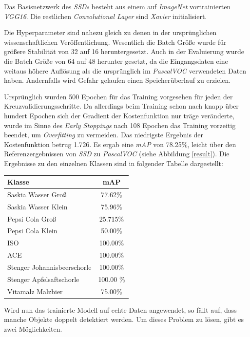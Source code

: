 Das Basisnetzwerk des \textit{SSDs} besteht aus einem auf \textit{ImageNet} vortrainierten \textit{VGG16}. Die restlichen \textit{Convolutional Layer} sind \textit{Xavier} initialisiert. 

Die Hyperparameter sind nahezu gleich zu denen in der ursprünglichen wissenschaftlichen Veröffentlichung. Wesentlich die Batch Größe wurde für größere Stabilität von 32 auf 16 heruntergesetzt. Auch in der Evaluierung wurde die Batch Größe von 64 auf 48 herunter gesetzt, da die Eingangsdaten eine weitaus höhere Auflösung als die ursprünglich im \textit{PascalVOC} verwendeten Daten haben. Andernfalls wird Gefahr gelaufen einen Speicherüberlauf zu erzielen. 

Ursprünglich wurden 500 Epochen für das Training vorgesehen für jeden der Kreuzvalidierungsschritte. Da allerdings beim Training schon nach knapp über hundert Epochen sich der Gradient der Kostenfunktion nur träge veränderte, wurde im Sinne des \textit{Early Stoppings} nach 108 Epochen das Training vorzeitig beendet, um \textit{Overfitting} zu vermeiden. Das niedrigste Ergebnis der Kostenfunktion betrug 1.726. Es ergab eine \textit{mAP} von 78.25\%, leicht über den Referenzergebnissen von \textit{SSD} zu \textit{PascalVOC} (siehe Abbildung \ref{result}). Die Ergebnisse zu den einzelnen Klassen sind in folgender Tabelle dargestellt:

\begin{center}
	\begin{tabular}[h]{l|c}
		Klasse & mAP \\
		\hline
		Saskia Wasser Groß & 77.62\% \\
		Saskia Wasser Klein & 75.96\% \\
		Pepsi Cola Groß & 25.715\% \\
		Pepsi Cola Klein & 50.00\% \\
		ISO & 100.00\% \\
		ACE & 100.00\% \\
		Stenger Johannisbeerschorle & 100.00\% \\
		Stenger Apfelsaftschorle & 100.00 \% \\
		Vitamalz Malzbier & 75.00\%
	\end{tabular}
	\label{table:ssdresults}
\end{center}

Wird nun das trainierte Modell auf echte Daten angewendet, so fällt auf, dass manche Objekte doppelt detektiert werden. Um dieses Problem zu lösen, gibt es zwei Möglichkeiten. 

